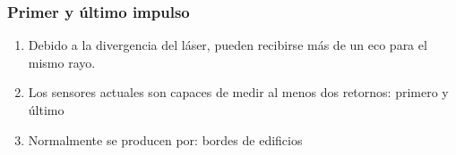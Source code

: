 \begin{frame}[label=firstlast1]
    \frametitle{Primer y último impulso}
    \begin{enumerate}[<+->]
        \item Debido a la divergencia del láser, pueden recibirse 
          \alert<1>{más de un eco} para el mismo rayo.
	\item Los sensores actuales son capaces de medir al menos dos retornos: 
          \alert<2>{primero} y \alert<2>{último}
	\item Normalmente se producen por: \alert<3->{bordes} de edificios 
    \end{enumerate}
    \begin{center}
      ~
    \end{center}
\end{frame}
